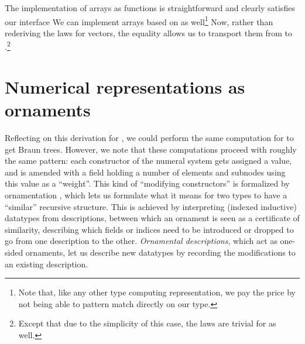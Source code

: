 The implementation of arrays as functions is straightforward
and clearly satisfies our interface
We can implement arrays based on  as well\footnote{Note that, like any other type computing representation, we pay the price by not being able to pattern match directly on our type.}
Now, rather than rederiving the laws for vectors, the equality allows us to transport them from  to .\footnote{Except that due to the simplicity of this case, the laws are trivial for  as well.}


\section{Numerical representations as ornaments}\label{sec:ornaments}
Reflecting on this derivation for \bN{}, we could perform the same computation for \bL{} to get Braun trees. However, we note that these computations proceed with roughly the same pattern: each constructor of the numeral system gets assigned a value, and is amended with a field holding a number of elements and subnodes using this value as a ``weight''. This kind of ``modifying constructors'' is formalized by ornamentation \cite{progorn}, which lets us formulate what it means for two types to have a ``similar'' recursive structure. This is achieved by interpreting (indexed inductive) datatypes from descriptions, between which an ornament is seen as a certificate of similarity, describing which fields or indices need to be introduced or dropped to go from one description to the other. \textit{Ornamental descriptions}, which act as one-sided ornaments, let us describe new datatypes by recording the modifications to an existing description.

